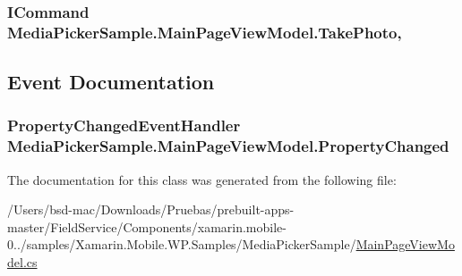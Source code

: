 \hypertarget{class_media_picker_sample_1_1_main_page_view_model_aebd650f23e27062b938d30f8bf798e9f}{
\subsubsection[{Take\+Photo}]{\setlength{\rightskip}{0pt plus 5cm}I\+Command Media\+Picker\+Sample.\+Main\+Page\+View\+Model.\+Take\+Photo\hspace{0.3cm}{\ttfamily [get]}, {\ttfamily [set]}}}\label{class_media_picker_sample_1_1_main_page_view_model_aebd650f23e27062b938d30f8bf798e9f}


\subsection{Event Documentation}
\hypertarget{class_media_picker_sample_1_1_main_page_view_model_ac3ae42ebb490a069dc6cffc2badaeb0b}{
\subsubsection[{Property\+Changed}]{\setlength{\rightskip}{0pt plus 5cm}Property\+Changed\+Event\+Handler Media\+Picker\+Sample.\+Main\+Page\+View\+Model.\+Property\+Changed}}\label{class_media_picker_sample_1_1_main_page_view_model_ac3ae42ebb490a069dc6cffc2badaeb0b}


The documentation for this class was generated from the following file\+:\begin{DoxyCompactItemize}
\item 
/\+Users/bsd-\/mac/\+Downloads/\+Pruebas/prebuilt-\/apps-\/master/\+Field\+Service/\+Components/xamarin.\+mobile-\/0../samples/\+Xamarin.\+Mobile.\+W\+P.\+Samples/\+Media\+Picker\+Sample/\hyperlink{_media_picker_sample_2_main_page_view_model_8cs}{Main\+Page\+View\+Model.\+cs}\end{DoxyCompactItemize}
